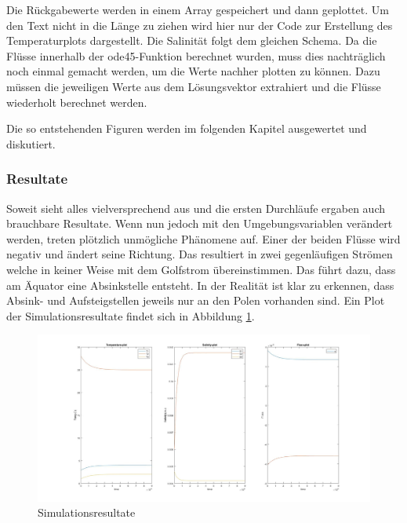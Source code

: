 \label{thermohalin:listing:solve}

Die Rückgabewerte werden in einem Array gespeichert und dann geplottet. Um den Text nicht in die Länge zu ziehen wird hier nur der Code zur Erstellung des Temperaturplots dargestellt. Die Salinität folgt dem gleichen Schema.
Da die Flüsse innerhalb der ode45-Funktion berechnet wurden, muss dies nachträglich noch einmal gemacht werden, um die Werte nachher plotten zu können. Dazu müssen die jeweiligen Werte aus dem Lösungsvektor extrahiert und die Flüsse wiederholt berechnet werden.
\label{thermohalin:listing:plot}

Die so entstehenden Figuren werden im folgenden Kapitel ausgewertet und diskutiert. 

\subsubsection{Resultate}


Soweit sieht alles vielversprechend aus und die ersten Durchläufe ergaben auch brauchbare Resultate. Wenn nun jedoch mit den Umgebungsvariablen verändert werden, treten plötzlich unmögliche Phänomene auf.
Einer der beiden Flüsse wird negativ und ändert seine Richtung. Das resultiert in zwei gegenläufigen Strömen welche in keiner Weise mit dem Golfstrom übereinstimmen. Das führt dazu, dass am Äquator eine Absinkstelle entsteht. In der Realität ist klar zu erkennen, dass Absink- und Aufsteigstellen jeweils nur an den Polen vorhanden sind. 
Ein Plot der Simulationsresultate findet sich in Abbildung \ref{thermohalin:simulationsresultate}.

\begin{figure}
	\includegraphics[width=14cm]{thermohalin/Code/graphs/result-3b2f-script.jpg}
	\centering
	\caption{Simulationsresultate}
	\label{thermohalin:simulationsresultate}
\end{figure}

